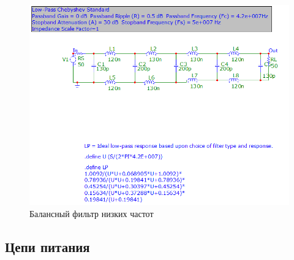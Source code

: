 \documentclass[utf8x, 14pt, oneside, a4paper]{article}
\begin{document}
		\begin{figure}[h!]
			\centering
			\includegraphics[width=0.8\linewidth]{Фильтр}
			\caption{Балансный фильтр низких частот}
			\label{fig:Бфильтр}
		\end{figure}
		
			
		\subsection{Цепи питания}
\end{document}
